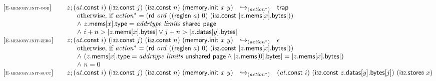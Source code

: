 $$
\begin{array}[t]{@{}lrcl@{}l@{}}
{[\textsc{\scriptsize E{-}memory.init{-}oob}]} \quad & z ; ({\mathit{at}}{.}\mathsf{const}~i)~(\mathsf{i{\scriptstyle 32}}{.}\mathsf{const}~j)~(\mathsf{i{\scriptstyle 32}}{.}\mathsf{const}~n)~(\mathsf{memory{.}init}~x~y) & {\hookrightarrow}_{({{\mathit{action}}^\ast})} {} & \mathsf{trap} &  \\
& \multicolumn{4}{@{}l@{}}{\quad
\quad
\begin{array}[t]{@{}l@{}}
\mbox{otherwise, if}~ {{\mathit{action}}^\ast} = (\mathsf{rd}~{\mathit{ord}}~((\mathsf{reglen}~a)~0)~(\mathsf{i{\scriptstyle 32}}{.}\mathsf{const}~{|z{.}\mathsf{mems}{}[x]{.}\mathsf{bytes}|})) \\
{\land}~ z{.}\mathsf{mems}{}[x]{.}\mathsf{type} = {\mathit{addrtype}}~{\mathit{limits}}~\mathsf{shared}~\mathsf{page} \\
{\land}~ i + n > {|z{.}\mathsf{mems}{}[x]{.}\mathsf{bytes}|} \lor j + n > {|z{.}\mathsf{datas}{}[y]{.}\mathsf{bytes}|} \\
\end{array}
} \\
{[\textsc{\scriptsize E{-}memory.init{-}zero}]} \quad & z ; ({\mathit{at}}{.}\mathsf{const}~i)~(\mathsf{i{\scriptstyle 32}}{.}\mathsf{const}~j)~(\mathsf{i{\scriptstyle 32}}{.}\mathsf{const}~n)~(\mathsf{memory{.}init}~x~y) & {\hookrightarrow}_{({{\mathit{action}}^\ast})} {} & \epsilon &  \\
& \multicolumn{4}{@{}l@{}}{\quad
\quad
\begin{array}[t]{@{}l@{}}
\mbox{otherwise, if}~ {{\mathit{action}}^\ast} = (\mathsf{rd}~{\mathit{ord}}~((\mathsf{reglen}~a)~0)~(\mathsf{i{\scriptstyle 32}}{.}\mathsf{const}~{|z{.}\mathsf{mems}{}[x]{.}\mathsf{bytes}|})) \\
{\land}~ (z{.}\mathsf{mems}{}[x]{.}\mathsf{type} = {\mathit{addrtype}}~{\mathit{limits}}~\mathsf{unshared}~\mathsf{page} \land {|z{.}\mathsf{mems}{}[0]{.}\mathsf{bytes}|} = {|z{.}\mathsf{mems}{}[x]{.}\mathsf{bytes}|}) \\
{\land}~ n = 0 \\
\end{array}
} \\
{[\textsc{\scriptsize E{-}memory.init{-}succ}]} \quad & z ; ({\mathit{at}}{.}\mathsf{const}~i)~(\mathsf{i{\scriptstyle 32}}{.}\mathsf{const}~j)~(\mathsf{i{\scriptstyle 32}}{.}\mathsf{const}~n)~(\mathsf{memory{.}init}~x~y) & {\hookrightarrow}_{({{\mathit{action}}^\ast})} {} & \begin{array}[t]{@{}l@{}} ({\mathit{at}}{.}\mathsf{const}~i)~(\mathsf{i{\scriptstyle 32}}{.}\mathsf{const}~z{.}\mathsf{datas}{}[y]{.}\mathsf{bytes}{}[j])~({\mathsf{i{\scriptstyle 32}}{.}\mathsf{store}}{\mathsf{{\scriptstyle 8}}}~x) \\

\end{array}
\end{array}$$
